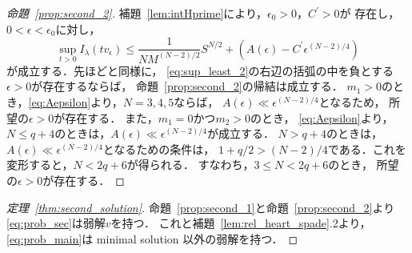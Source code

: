 \begin{proof}[命題~\ref{prop:second_2}]
 補題~\ref{lem:intHprime}により，$\epsilon_0 > 0$，$C^\prime > 0$が
 存在し，$0 < \epsilon < \epsilon_0$に対し，
 \begin{equation}
  \sup_{t > 0} I_\lambda (tv_\epsilon) \leq \frac{1}{NM^{(N-2)/2}}
   S^{N/2} + \left( A(\epsilon) - C^\prime \epsilon^{(N-2)/4}
             \right) \label{eq:sup_least_2}
 \end{equation}
 が成立する．先ほどと同様に，
 \eqref{eq:sup_least_2}の右辺の括弧の中を負とする
 $\epsilon > 0$が存在するならば，
 命題~\ref{prop:second_2}の帰結は成立する．
 $m_1 > 0$のとき，\eqref{eq:Aepsilon}より，$N = 3, 4, 5$ならば，
 $A(\epsilon) \ll \epsilon^{(N-2)/4}$となるため，
 所望の$\epsilon > 0$が存在する．
 また，$m_1 = 0$かつ$m_2 > 0$のとき，
 \eqref{eq:Aepsilon}より，
 $N \leq q+4$のときは，$A(\epsilon) \ll \epsilon^{(N-2)/4}$が成立する．
 $N > q+4$のときは，
 $A(\epsilon) \ll \epsilon^{(N-2)/4}$となるための条件は，
 $1+q/2 > (N-2)/4$である．これを変形すると，$N < 2q+6$が得られる．
 すなわち，$3 \leq N < 2q+6$のとき，
 所望の$\epsilon > 0$が存在する．\qedhere
\end{proof}

\begin{proof}[定理~\ref{thm:second_solution}]
 命題~\ref{prop:second_1}と命題~\ref{prop:second_2}より
 \ref{eq:prob_sec}は弱解$v$を持つ．
 これと補題~\ref{lem:rel_heart_spade}.2より，\ref{eq:prob_main}は
 minimal solution 以外の弱解を持つ．
 \qedhere
\end{proof}

